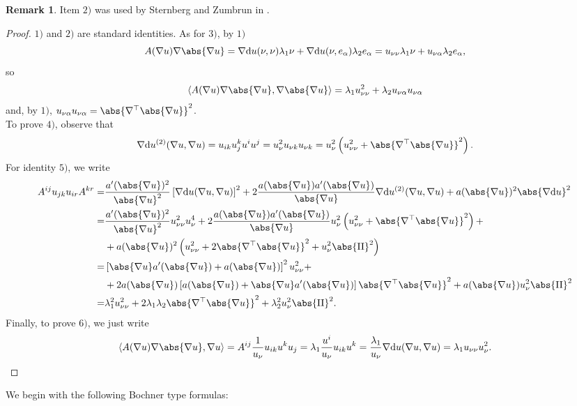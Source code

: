 \documentclass[10 pt,a4paper]{article}
\theoremstyle{definition}
\newtheorem{remark}[definition]{Remark}
\begin{document}
\begin{remark}
	Item $2)$ was used by Sternberg and Zumbrun in \cite{sternbergzumbrun1}.
\end{remark}
%
%
\begin{proof}
	$1)$ and $2)$ are standard identities. As for $3)$, by $1)$
	$$
	A(\nabla u)\nabla\abs{\nabla u}=\nabla \di   u(\nu,\nu)\lambda_1\nu+\nabla \di   u(\nu,e_\alpha)\lambda_2e_\alpha=u_{\nu\nu}\lambda_1\nu+u_{\nu\alpha}\lambda_2e_\alpha,
	$$
	so
	$$
	\langle A(\nabla u)\nabla\abs{\nabla u},\nabla\abs{\nabla u}\rangle=\lambda_1u_{\nu\nu}^2+\lambda_2u_{\nu\alpha}u_{\nu\alpha}
	$$
	and, by $1)$, $u_{\nu\alpha}u_{\nu\alpha}=\abs{\nabla^\top  \abs{\nabla u}}^2$.\\
	To prove $4)$, observe that
	$$
	\nabla \di u^{(2)}(\nabla u,\nabla u)=u_{ik}u^k_ju^iu^j=u_\nu^2 u_{\nu k}u_{\nu k}=u_\nu^2\left(u_{\nu\nu}^2+\abs{\nabla^\top  \abs{\nabla u}}^2\right).
	$$
	For identity $5)$, we write
	\begin{align*}
		A^{ij}u_{jk}u_{ir}A^{kr}=&\frac{a'(\abs{\nabla u})^2}{\abs{\nabla u}^2}\left[\nabla \di  u(\nabla u,\nabla u)\right]^2+2\frac{a(\abs{\nabla u})a'(\abs{\nabla u})}{\abs{\nabla u}}\nabla \di u^{(2)}(\nabla u,\nabla u)+a(\abs{\nabla u})^2\abs{\nabla \di  u}^2\\
		=&\frac{a'(\abs{\nabla u})^2}{\abs{\nabla u}^2}u_{\nu\nu}^2u_\nu^4+2\frac{a(\abs{\nabla u})a'(\abs{\nabla u})}{\abs{\nabla u}}u_\nu^2\left(u_{\nu\nu}^2+\abs{\nabla^\top  \abs{\nabla u}}^2\right)+\\
		&+a(\abs{\nabla u})^2\left(u_{\nu\nu}^2+2\abs{\nabla^\top  \abs{\nabla u}}^2+u_\nu^2\abs{\operatorname{II}}^2\right)\\
		=&\left[\abs{\nabla u}a'(\abs{\nabla u})+a(\abs{\nabla u})\right]^2u_{\nu\nu}^2+\\
		&+2a(\abs{\nabla u})\left[a(\abs{\nabla u})+\abs{\nabla u}a'(\abs{\nabla u})\right]\abs{\nabla^\top  \abs{\nabla u}}^2+a(\abs{\nabla u})u_\nu^2\abs{\operatorname{II}}^2\\
		=&\lambda_1^2u_{\nu\nu}^2+2\lambda_1\lambda_2\abs{\nabla^\top  \abs{\nabla u}}^2+\lambda_2^2u_\nu^2\abs{\operatorname{II}}^2.
	\end{align*} 
	Finally, to prove $6)$, we just write
	$$
	\langle A(\nabla u)\nabla\abs{\nabla u},\nabla u\rangle=A^{ij}\frac1{u_\nu}u_{ik}u^ku_j=\lambda_1\frac{u^i}{u_\nu}u_{ik}u^k=\frac{\lambda_1}{u_\nu}\nabla \di  u(\nabla u,\nabla u)=\lambda_1u_{\nu\nu}u_\nu^2.
	$$
\end{proof}


We begin with the following Bochner type formulas:
\end{document}
